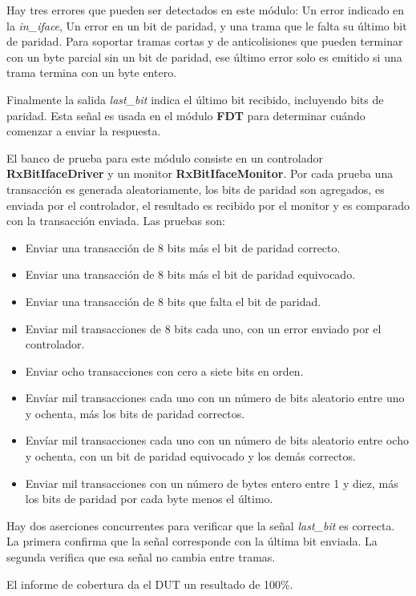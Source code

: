 \documentclass[a4paper, twoside, 11pt]{report}
\begin{document}
Hay tres errores que pueden ser detectados en este módulo: Un error indicado en la \textit{in\_iface}, Un error en un bit de paridad, y una trama que le falta su último bit de paridad. Para soportar tramas cortas y de anticolisiones que pueden terminar con un byte parcial sin un bit de paridad, ese último error solo es emitido si una trama termina con un byte entero.

Finalmente la salida \textit{last\_bit} indica el último bit recibido, incluyendo bits de paridad. Esta señal es usada en el módulo \textbf{FDT} para determinar cuándo comenzar a enviar la respuesta.

El banco de prueba para este módulo consiste en un controlador \textbf{RxBitIfaceDriver} y un monitor \textbf{RxBitIfaceMonitor}. Por cada prueba una transacción es generada aleatoriamente, los bits de paridad son agregados, es enviada por el controlador, el resultado es recibido por el monitor y es comparado con la transacción enviada. Las pruebas son:

\begin{itemize}
  \item Enviar una transacción de 8 bits más el bit de paridad correcto.
  \item Enviar una transacción de 8 bits más el bit de paridad equivocado.
  \item Enviar una transacción de 8 bits que falta el bit de paridad.
  \item Enviar mil transacciones de 8 bits cada uno, con un error enviado por el controlador.
  \item Enviar ocho transacciones con cero a siete bits en orden.
  \item Envíar mil transacciones cada uno con un número de bits aleatorio entre uno y ochenta, más los bits de paridad correctos.
  \item Envíar mil transacciones cada uno con un número de bits aleatorio entre ocho y ochenta, con un bit de paridad equivocado y los demás correctos.
  \item Enviar mil transacciones con un número de bytes entero entre 1 y diez, más los bits de paridad por cada byte menos el último.
\end{itemize}

Hay dos aserciones concurrentes para verificar que la señal \textit{last\_bit} es correcta. La primera confirma que la señal corresponde con la última bit enviada. La segunda verifica que esa señal no cambia entre tramas.

El informe de cobertura da el DUT un resultado de 100\%.
\end{document}
